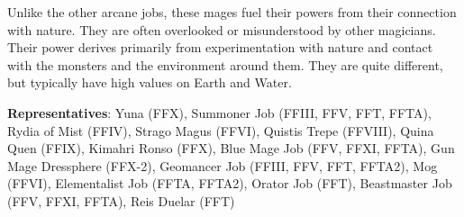 \begin{jobdesc}[name=pjob-druid]
    Unlike the other arcane jobs, these mages fuel their powers from their connection with nature. They are often overlooked or misunderstood by other magicians. Their power derives primarily from experimentation with nature and contact with the monsters and the environment around them. They are quite different, but typically have high values on Earth and Water. \pc%

    \textbf{Representatives}: Yuna (FFX), Summoner Job (FFIII, FFV, FFT, FFTA), Rydia of Mist (FFIV), Strago Magus (FFVI), Quistis Trepe (FFVIII), Quina Quen (FFIX), Kimahri Ronso (FFX), Blue Mage Job (FFV, FFXI, FFTA), Gun Mage Dressphere (FFX-2), Geomancer Job (FFIII, FFV, FFT, FFTA2), Mog (FFVI), Elementalist Job (FFTA, FFTA2), Orator Job (FFT), Beastmaster Job (FFV, FFXI, FFTA), Reis Duelar (FFT) \pc%

    \jobstats[hpa=3x,hpb=4x,hpc=5x,hpd=6x,mpa=1x,mpb=2x,mpc=3x,armor=Medium,weapons=Claws/Gloves \\ Wands \\ Throwing Weapons]
\end{jobdesc}

